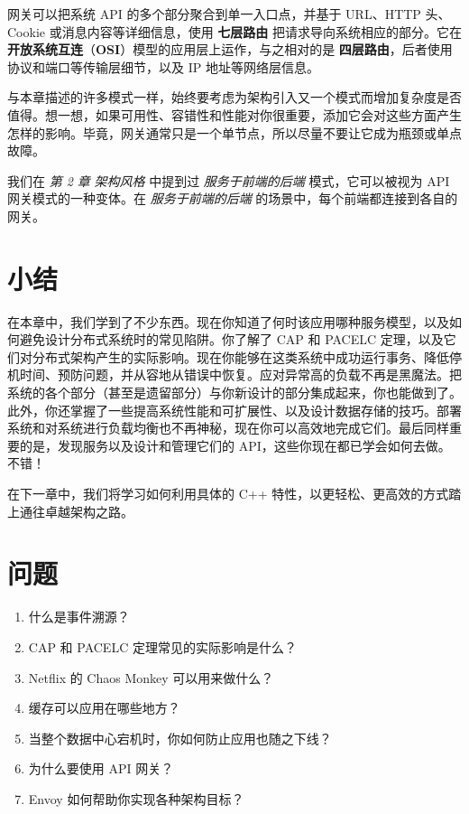 
网关可以把系统 API 的多个部分聚合到单一入口点，并基于 URL、HTTP 头、Cookie 或消息内容等详细信息，使用 \textbf{七层路由} 把请求导向系统相应的部分。它在 \textbf{开放系统互连}（\textbf{OSI}）模型的应用层上运作，与之相对的是 \textbf{四层路由}，后者使用协议和端口等传输层细节，以及 IP 地址等网络层信息。


与本章描述的许多模式一样，始终要考虑为架构引入又一个模式而增加复杂度是否值得。想一想，如果可用性、容错性和性能对你很重要，添加它会对这些方面产生怎样的影响。毕竟，网关通常只是一个单节点，所以尽量不要让它成为瓶颈或单点故障。

我们在 \emph{第 2 章} \emph{架构风格} 中提到过 \emph{服务于前端的后端} 模式，它可以被视为 API 网关模式的一种变体。在 \emph{服务于前端的后端} 的场景中，每个前端都连接到各自的网关。

\section{小结}

在本章中，我们学到了不少东西。现在你知道了何时该应用哪种服务模型，以及如何避免设计分布式系统时的常见陷阱。你了解了 CAP 和 PACELC 定理，以及它们对分布式架构产生的实际影响。现在你能够在这类系统中成功运行事务、降低停机时间、预防问题，并从容地从错误中恢复。应对异常高的负载不再是黑魔法。把系统的各个部分（甚至是遗留部分）与你新设计的部分集成起来，你也能做到了。此外，你还掌握了一些提高系统性能和可扩展性、以及设计数据存储的技巧。部署系统和对系统进行负载均衡也不再神秘，现在你可以高效地完成它们。最后同样重要的是，发现服务以及设计和管理它们的 API，这些你现在都已学会如何去做。不错！

在下一章中，我们将学习如何利用具体的 C++ 特性，以更轻松、更高效的方式踏上通往卓越架构之路。

\section{问题}

\begin{enumerate}
\item 什么是事件溯源？
\item CAP 和 PACELC 定理常见的实际影响是什么？
\item Netflix 的 Chaos Monkey 可以用来做什么？
\item 缓存可以应用在哪些地方？
\item 当整个数据中心宕机时，你如何防止应用也随之下线？
\item 为什么要使用 API 网关？
\item Envoy 如何帮助你实现各种架构目标？
\end{enumerate}

